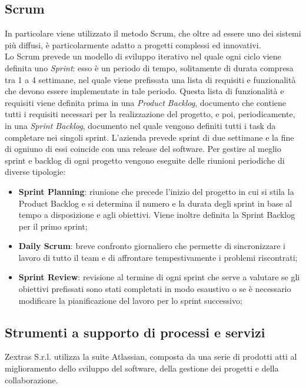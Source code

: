\subsection{Scrum}
In particolare  viene utilizzato il metodo Scrum, che oltre ad essere uno dei sistemi più diffusi, è particolarmente adatto a progetti complessi ed innovativi.\\
Lo Scrum prevede un modello di sviluppo iterativo nel quale ogni ciclo viene definita uno \emph{Sprint}: esso è un periodo di tempo, solitamente di durata compresa tra 1 a 4 settimane, nel quale viene prefissata una lista di requisiti e funzionalità che devono essere implementate in tale periodo.
Questa lista di funzionalità e requisiti viene definita prima in una \emph{Product Backlog}, documento che contiene tutti i requisiti necessari per la realizzazione del progetto, e poi, periodicamente, in una \emph{Sprint Backlog}, documento nel quale vengono definiti tutti i task da completare nei singoli sprint.
L'azienda prevede sprint di due settimane e la fine di ogniuno di essi coincide con una release del software.
Per gestire al meglio sprint e backlog di ogni progetto vengono eseguite delle riunioni periodiche di diverse tipologie:
\begin{itemize}
	\item \textbf{Sprint Planning}: riunione che precede l'inizio del progetto in cui si stila la Product Backlog e si determina il numero e la durata degli sprint in base al tempo a disposizione e agli obiettivi. Viene inoltre definita la Sprint Backlog per il primo sprint;
	\item \textbf{Daily Scrum}: breve confronto giornaliero che permette di sincronizzare i lavoro di tutto il team e di affrontare tempestivamente i problemi riscontrati;
	\item \textbf{Sprint Review}: revisione al termine di ogni sprint che serve a valutare se gli obiettivi prefissati sono stati completati in modo esaustivo o se è necessario modificare la pianificazione del lavoro per lo sprint successivo;
\end{itemize}

\subsection{Strumenti a supporto di processi e servizi} 
Zextras S.r.l. utilizza la suite Atlassian, composta da una serie di prodotti atti al miglioramento dello sviluppo del software, della gestione dei progetti e della collaborazione. 
